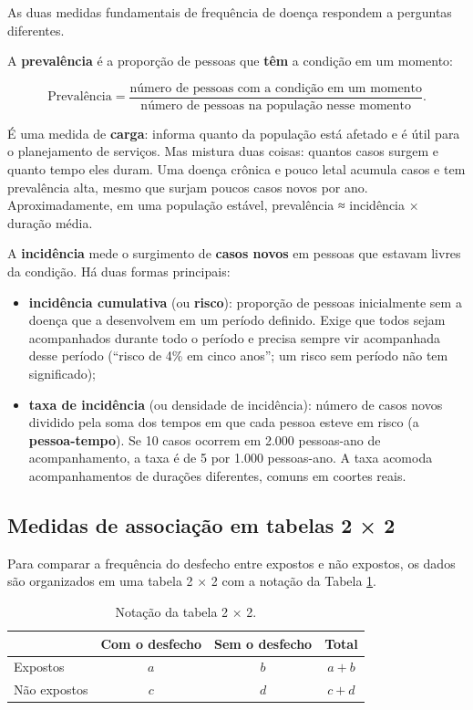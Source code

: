 \documentclass[
]{book}
\providecommand{\tightlist}{%
  \setlength{\itemsep}{0pt}\setlength{\parskip}{0pt}}
\begin{document}
As duas medidas fundamentais de frequência de doença respondem a perguntas diferentes.

A \textbf{prevalência} é a proporção de pessoas que \textbf{têm} a condição em um momento:

\[
\text{Prevalência} = \frac{\text{número de pessoas com a condição em um momento}}{\text{número de pessoas na população nesse momento}} .
\]

É uma medida de \textbf{carga}: informa quanto da população está afetado e é útil para o planejamento de serviços. Mas mistura duas coisas: quantos casos surgem e quanto tempo eles duram. Uma doença crônica e pouco letal acumula casos e tem prevalência alta, mesmo que surjam poucos casos novos por ano. Aproximadamente, em uma população estável, prevalência ≈ incidência × duração média.

A \textbf{incidência} mede o surgimento de \textbf{casos novos} em pessoas que estavam livres da condição. Há duas formas principais:

\begin{itemize}
\tightlist
\item
  \textbf{incidência cumulativa} (ou \textbf{risco}): proporção de pessoas inicialmente sem a doença que a desenvolvem em um período definido. Exige que todos sejam acompanhados durante todo o período e precisa sempre vir acompanhada desse período (``risco de 4\% em cinco anos''; um risco sem período não tem significado);
\item
  \textbf{taxa de incidência} (ou densidade de incidência): número de casos novos dividido pela soma dos tempos em que cada pessoa esteve em risco (a \textbf{pessoa-tempo}). Se 10 casos ocorrem em 2.000 pessoas-ano de acompanhamento, a taxa é de 5 por 1.000 pessoas-ano. A taxa acomoda acompanhamentos de durações diferentes, comuns em coortes reais.
\end{itemize}

\subsection{Medidas de associação em tabelas 2 × 2}\label{medidas-de-associauxe7uxe3o-em-tabelas-2-2}

Para comparar a frequência do desfecho entre expostos e não expostos, os dados são organizados em uma tabela 2 × 2 com a notação da Tabela \ref{tab:des-notacao}.

\begin{table}

\caption{\label{tab:des-notacao}Notação da tabela 2 × 2.}
\centering
\begin{tabular}[t]{l|c|c|c}
\hline
 & Com o desfecho & Sem o desfecho & Total\\
\hline
Expostos & $a$ & $b$ & $a + b$\\
\hline
Não expostos & $c$ & $d$ & $c + d$\\
\hline
\end{tabular}
\end{table}
\end{document}
